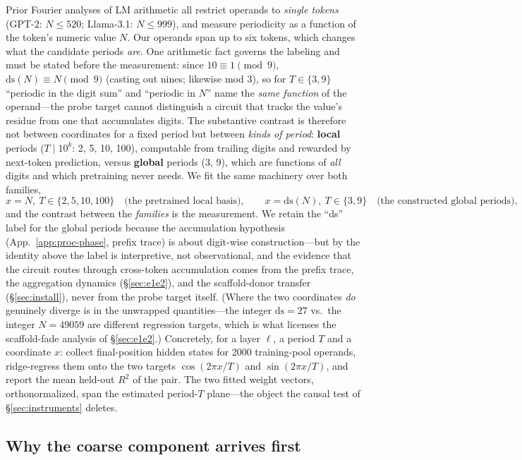 \documentclass{article} %
\begin{document}
Prior Fourier analyses of LM arithmetic all restrict operands to \emph{single tokens} (GPT-2: $N \le 520$; Llama-3.1: $N \le 999$), and measure periodicity as a function of the token's numeric value $N$. Our operands span up to six tokens, which changes what the candidate periods \emph{are}. One arithmetic fact governs the labeling and must be stated before the measurement: since $10 \equiv 1 \pmod 9$, $\mathrm{ds}(N) \equiv N \pmod 9$ (casting out nines; likewise mod 3), so for $T \in \{3, 9\}$ ``periodic in the digit sum'' and ``periodic in $N$'' name the \emph{same function} of the operand---the probe target cannot distinguish a circuit that tracks the value's residue from one that accumulates digits. The substantive contrast is therefore not between coordinates for a fixed period but between \emph{kinds of period}: \textbf{local} periods ($T \mid 10^k$: 2, 5, 10, 100), computable from trailing digits and rewarded by next-token prediction, versus \textbf{global} periods (3, 9), which are functions of \emph{all} digits and which pretraining never needs. We fit the same machinery over both families,
\[
x = N,\ T \in \{2, 5, 10, 100\} \quad\text{(the pretrained local basis)}, \qquad x = \mathrm{ds}(N),\ T \in \{3, 9\} \quad\text{(the constructed global periods)},
\]
and the contrast between the \emph{families} is the measurement. We retain the ``ds'' label for the global periods because the accumulation hypothesis (App.~\ref{app:proc-phase}, prefix trace) is about digit-wise construction---but by the identity above the label is interpretive, not observational, and the evidence that the circuit routes through cross-token accumulation comes from the prefix trace, the aggregation dynamics (\S\ref{sec:e1e2}), and the scaffold-donor transfer (\S\ref{sec:install}), never from the probe target itself. (Where the two coordinates \emph{do} genuinely diverge is in the unwrapped quantities---the integer $\mathrm{ds} = 27$ vs.\ the integer $N = 49059$ are different regression targets, which is what licenses the scaffold-fade analysis of \S\ref{sec:e1e2}.) Concretely, for a layer $\ell$, a period $T$ and a coordinate $x$: collect final-position hidden states for 2000 training-pool operands, ridge-regress them onto the two targets $\cos(2\pi x/T)$ and $\sin(2\pi x/T)$, and report the mean held-out $R^2$ of the pair. The two fitted weight vectors, orthonormalized, span the estimated period-$T$ plane---the object the causal test of \S\ref{sec:instruments} deletes.

\subsection{Why the coarse component arrives first}
\label{app:bg-order}
\end{document}
